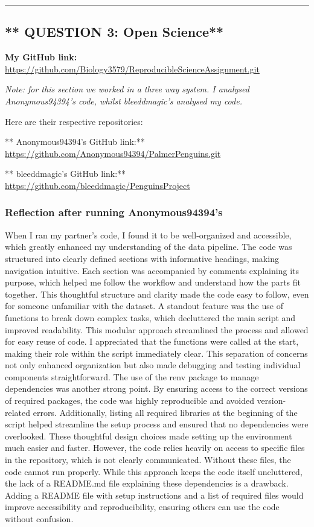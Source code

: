\documentclass[
]{article}
\begin{document}
\begin{center}\rule{0.5\linewidth}{0.5pt}\end{center}

\subsection{** QUESTION 3: Open
Science**}\label{question-3-open-science}

\textbf{My GitHub link:}
\url{https://github.com/Biology3579/ReproducibleScienceAssignment.git}

\emph{Note: for this section we worked in a three way system. I analysed
Anonymous94394's code, whilst bleeddmagic's analysed my code.}

Here are their respective repositories:

** Anonymous94394's GitHub link:**
\url{https://github.com/Anonymous94394/PalmerPenguins.git}

** bleeddmagic's GitHub link:**
\url{https://github.com/bleeddmagic/PenguinsProject}

\subsubsection{Reflection after running
Anonymous94394's}\label{reflection-after-running-anonymous94394s}

When I ran my partner's code, I found it to be well-organized and
accessible, which greatly enhanced my understanding of the data
pipeline. The code was structured into clearly defined sections with
informative headings, making navigation intuitive. Each section was
accompanied by comments explaining its purpose, which helped me follow
the workflow and understand how the parts fit together. This thoughtful
structure and clarity made the code easy to follow, even for someone
unfamiliar with the dataset. A standout feature was the use of functions
to break down complex tasks, which decluttered the main script and
improved readability. This modular approach streamlined the process and
allowed for easy reuse of code. I appreciated that the functions were
called at the start, making their role within the script immediately
clear. This separation of concerns not only enhanced organization but
also made debugging and testing individual components straightforward.
The use of the renv package to manage dependencies was another strong
point. By ensuring access to the correct versions of required packages,
the code was highly reproducible and avoided version-related errors.
Additionally, listing all required libraries at the beginning of the
script helped streamline the setup process and ensured that no
dependencies were overlooked. These thoughtful design choices made
setting up the environment much easier and faster. However, the code
relies heavily on access to specific files in the repository, which is
not clearly communicated. Without these files, the code cannot run
properly. While this approach keeps the code itself uncluttered, the
lack of a README.md file explaining these dependencies is a drawback.
Adding a README file with setup instructions and a list of required
files would improve accessibility and reproducibility, ensuring others
can use the code without confusion.
\end{document}
